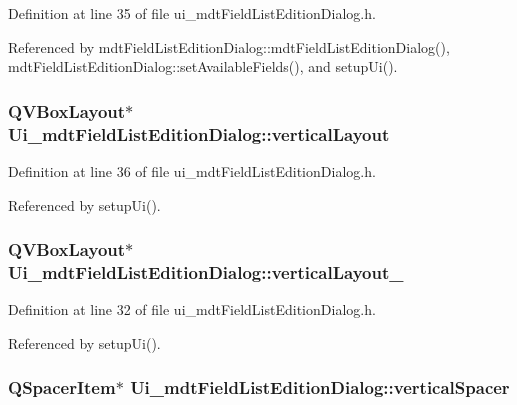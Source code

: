 Definition at line 35 of file ui\-\_\-mdt\-Field\-List\-Edition\-Dialog.\-h.



Referenced by mdt\-Field\-List\-Edition\-Dialog\-::mdt\-Field\-List\-Edition\-Dialog(), mdt\-Field\-List\-Edition\-Dialog\-::set\-Available\-Fields(), and setup\-Ui().

\hypertarget{class_ui__mdt_field_list_edition_dialog_ae01322016bbd7a90b42580eac4cef162}{
\subsubsection[{vertical\-Layout}]{\setlength{\rightskip}{0pt plus 5cm}Q\-V\-Box\-Layout$\ast$ Ui\-\_\-mdt\-Field\-List\-Edition\-Dialog\-::vertical\-Layout}}\label{class_ui__mdt_field_list_edition_dialog_ae01322016bbd7a90b42580eac4cef162}


Definition at line 36 of file ui\-\_\-mdt\-Field\-List\-Edition\-Dialog.\-h.



Referenced by setup\-Ui().

\hypertarget{class_ui__mdt_field_list_edition_dialog_a4dfd8640ff6bd98a984e6e3180fa8dfb}{
\subsubsection[{vertical\-Layout\-\_\-2}]{\setlength{\rightskip}{0pt plus 5cm}Q\-V\-Box\-Layout$\ast$ Ui\-\_\-mdt\-Field\-List\-Edition\-Dialog\-::vertical\-Layout\-\_}}\label{class_ui__mdt_field_list_edition_dialog_a4dfd8640ff6bd98a984e6e3180fa8dfb}


Definition at line 32 of file ui\-\_\-mdt\-Field\-List\-Edition\-Dialog.\-h.



Referenced by setup\-Ui().

\hypertarget{class_ui__mdt_field_list_edition_dialog_a5c9c852b40e81c29b8ddba8f7ffae2a1}{
\subsubsection[{vertical\-Spacer}]{\setlength{\rightskip}{0pt plus 5cm}Q\-Spacer\-Item$\ast$ Ui\-\_\-mdt\-Field\-List\-Edition\-Dialog\-::vertical\-Spacer}}\label{class_ui__mdt_field_list_edition_dialog_a5c9c852b40e81c29b8ddba8f7ffae2a1}


